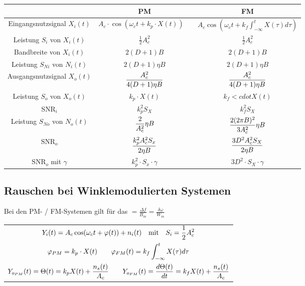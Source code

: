 \documentclass[a4paper]{article}
\begin{document}
\begin{twocolumn}
\begin{footnotesize}
\begin{tabular}{|c|c|c|}
  \hline & \textbf{PM} & \textbf{FM} \\ \hline
  Eingangsnutzsignal $X_i(t)$ & $A_c \cdot \cos(\omega_c t + k_p \cdot X(t)) \quad$ & 
  $A_c \cos(\omega_c t + k_f \int_{-\infty}^t X(\tau) d\tau)$ \\\hline
  Leistung $S_i$ von $X_i(t)$ & $\frac{1}{2} A_c^2$ & $\frac{1}{2} A_c^2$ \\ \hline
  Bandbreite von $X_i(t)$ & $2(D + 1)B$ & $2(D + 1) B$ \\ \hline
  Leistung $S_{Ni}$ von $N_i(t)$ & $2(D + 1)\eta B$ & $2(D + 1) \eta B$ \\ \hline
  Ausgangsnutzsignal $X_o(t)$ & $\displaystyle \frac{A_c^2}{4(D+1)\eta B}$ & 
  $\displaystyle \frac{A_c^2}{4(D+1)\eta B}$ \\ \hline
  Leistung $S_o$ von $X_o(t)$ & $k_p \cdot X(t)$ & $k_f <cdot X(t)$ \\ \hline
  $\text{SNR}_i$ & $k_p^2 S_X$ & $k_f^2 S_X$ \\ \hline
  Leistung $S_{No}$ von $N_o(t)$ & $\displaystyle \frac{2}{A_c^2} \eta B$ & 
  $\displaystyle \frac{2(2\pi B)^2}{3A_c^2} \eta B$ \\ \hline
  $\text{SNR}_o$ & $\displaystyle \frac{k_p^2 A_c^2 S_x}{2 \eta B}$ & 
  $\displaystyle \frac{3 D^2 A_c^2 S_X}{2 \eta B}$ \\ \hline
  $\text{SNR}_o$ mit $\gamma$ & $k_p^2 \cdot S_x \cdot \gamma $ & 
  $3 D^2 \cdot S_X \cdot \gamma$ \\ \hline
\end{tabular}
\end{footnotesize}


\subsection{Rauschen bei Winklemodulierten Systemen}

Bei den PM- / FM-Systemen gilt für das  $ = \frac{\Delta f}{B_m} = \frac{\delta \omega}{W_m}$ 

\begin{tabular}{c}
  $\displaystyle Y_i(t) = A_c \cos(\omega_c t + \varphi(t)) + n_i(t) \quad \text{mit} \quad S_i = \frac{1}{2} A_c^2$ \\
  $\displaystyle \varphi_{PM} = k_p \cdot X(t) \qquad \varphi_{FM}(t) = k_f \int_{-\infty}^t X(\tau) d\tau$\\
  $\displaystyle Y_{o_{PM}}(t) = \Theta(t) = k_p X(t) + \frac{n_s(t)}{A_c} \qquad Y_{o_{FM}}(t) = \frac{d\Theta(t)}{dt} = k_f X(t) + \frac{n_s(t)}{A_c}$
\end{tabular}



\end{twocolumn}
\end{document}
